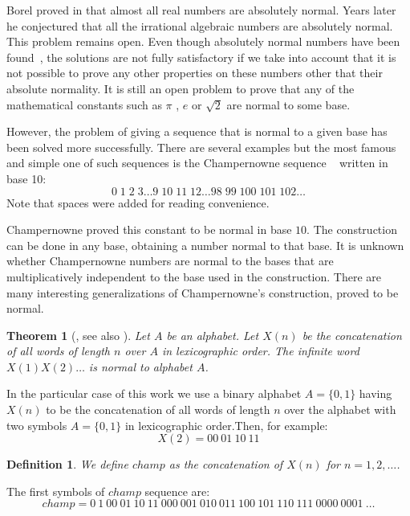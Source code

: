 \documentclass[11pt,a4paper]{tesis}
\newtheorem{theorem}{Theorem}[]
\newtheorem{definition}{Definition}[]
\begin{document}
Borel  proved in \cite{Borel} that almost all real numbers are absolutely normal. Years later 
he conjectured that all the irrational algebraic numbers are absolutely normal. 
This problem remains open.
Even though absolutely normal numbers have been found~\cite{Sierpinski,turing,BHS,FN},
 the solutions are not fully satisfactory
 if we take into account that it is not possible to prove any other properties on these numbers other that their absolute normality.
It is still an open problem to prove that any of the mathematical constants such as $\pi$ , $e$ or $\sqrt{2}$ are normal to some base.


However, the problem of giving a sequence that is normal to a given base has been solved more successfully.
 There are several examples but the most famous and simple one of such sequences is the 
Champernowne sequence ~\cite{champern} written in base 10:
$$0 \; 1 \;2 \;3 \dots 9 \; 10 \; 11 \; 12 \dots 98 \; 99 \; 100 \; 101 \; 102 \dots$$ 
Note that spaces were added for reading convenience.


Champernowne proved this constant to be normal in base $10$. 
The construction can be done in any base, obtaining a number normal to that base. It is unknown whether Champernowne numbers are normal to
the bases that are multiplicatively independent to the base used in the construction. 
There are many interesting generalizations of Champernowne's construction, proved to be normal. 
\medskip

\begin{theorem}[\cite{champern}, see also \cite{BC2018}]
    Let $A$ be an alphabet. Let $X(n)$ be the concatenation of all words of length $n$ over $A$ in lexicographic order.
     The infinite word $X(1)X(2)\dots$ is normal to alphabet $A$.
\end{theorem}

In the particular case of this work we use a binary alphabet  $A=\{0,1\}$ having $X(n)$ to be the concatenation of all words of length $n$ over the alphabet with two symbols $A=\{0,1\}$ in lexicographic order.Then, for example:
$$X(2) = 00 \: 01 \: 10 \: 11$$

\begin{definition}
We define  $champ$ as the concatenation of $X(n)$ for $n = 1,2,\dots$.
\end{definition}
The first symbols of $champ$ sequence are:
$$champ = 0 \: 1 \: 00 \: 01 \: 10 \: 11 \: 000 \: 001 \: 010 \: 011 \: 100 \: 101 \: 110 \: 111 \: 0000 \: 0001 \: \dots$$
\end{document}
